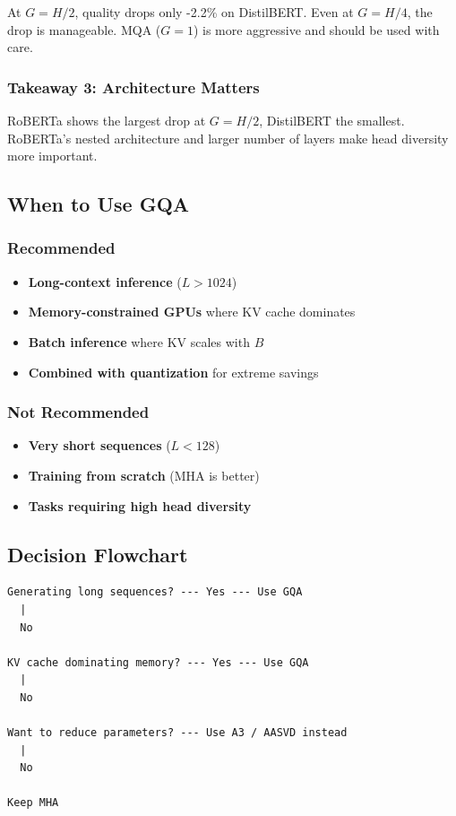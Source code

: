 At $G = H/2$, quality drops only -2.2\% on DistilBERT. Even at 
$G = H/4$, the drop is manageable. MQA ($G = 1$) is more aggressive and 
should be used with care.

\subsubsection{Takeaway 3: Architecture Matters}

RoBERTa shows the largest drop at $G = H/2$, DistilBERT the smallest. 
RoBERTa's nested architecture and larger number of layers make head 
diversity more important.

\subsection{When to Use GQA}

\subsubsection{Recommended}

\begin{itemize}
\item \textbf{Long-context inference} ($L > 1024$)
\item \textbf{Memory-constrained GPUs} where KV cache dominates
\item \textbf{Batch inference} where KV scales with $B$
\item \textbf{Combined with quantization} for extreme savings

\end{itemize}
\subsubsection{Not Recommended}

\begin{itemize}
\item \textbf{Very short sequences} ($L < 128$)
\item \textbf{Training from scratch} (MHA is better)
\item \textbf{Tasks requiring high head diversity}

\end{itemize}
\subsection{Decision Flowchart}

\begin{lstlisting}
Generating long sequences? --- Yes --- Use GQA
  |
  No
   
KV cache dominating memory? --- Yes --- Use GQA
  |
  No
   
Want to reduce parameters? --- Use A3 / AASVD instead
  |
  No
   
Keep MHA
\end{lstlisting}

